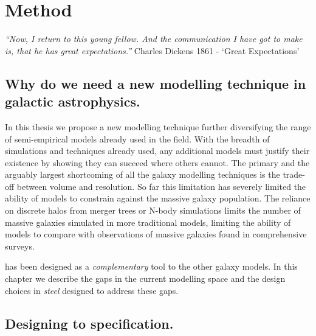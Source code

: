 
\chapter{Method} %
\label{Chapter:Method}
\begin{center}
    \textit{``Now, I return to this young fellow. And the communication I have got to make is, that he has great expectations.''}
    Charles Dickens 1861 - `Great Expectations'
\end{center}

\section{Why do we need a new modelling technique in galactic astrophysics.}
In this thesis we propose a new modelling technique further diversifying the range of semi-empirical models already used in the field. With the breadth of simulations and techniques already used, any additional models must justify their existence by showing they can succeed where others cannot. The primary and the arguably largest shortcoming of all the galaxy modelling techniques is the trade-off between volume and resolution. So far this limitation has severely limited the ability of models to constrain against the massive galaxy population. The reliance on discrete halos from merger trees or N-body simulations limits the number of massive galaxies simulated in more traditional models, limiting the ability of models to compare with observations of massive galaxies found in comprehensive surveys. 

\steel has been designed as a \textit{complementary} tool to the other galaxy models. In this chapter we describe the gaps in the current modelling space and the design choices in \textit{steel} designed to address these gaps.

\section{Designing to specification.}
